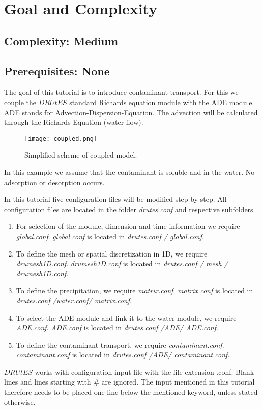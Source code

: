 \documentclass[
10pt, %
a4paper, %
oneside, %
headinclude,footinclude, %
BCOR5mm, %
]{scrartcl}
\begin{document}
\section{Goal and Complexity}
\subsection*{Complexity: Medium}

\subsection*{Prerequisites: None}

The goal of this tutorial is to introduce contaminant transport. For this we couple the $DRUtES$ standard Richards equation module with the ADE module. ADE stands for Advection-Dispersion-Equation. The advection will be calculated through the Richards-Equation (water flow).

\begin{figure}[!h]
\centering
\texttt{[image: coupled.png]}
\caption{Simplified scheme of coupled model.}
\end{figure}

In this example we assume that the contaminant is soluble and in the water. No adsorption or desorption occurs. 

In this tutorial five configuration files will be modified step by step. All configuration files are located in the folder \emph{drutes.conf} and respective subfolders. \begin{enumerate}
\item For selection of the module, dimension and time information we require \emph{global.conf}.  \emph{global.conf} is located in \emph{drutes.conf / global.conf}. 
\item To define the mesh or spatial discretization in 1D,  we require \emph{drumesh1D.conf}. \emph{drumesh1D.conf} is located in \emph{drutes.conf / mesh / drumesh1D.conf}. 
\item To define the precipitation, we require \emph{matrix.conf}. \emph{matrix.conf} is located in \emph{drutes.conf /water.conf/ matrix.conf}. 
\item To select the ADE module and link it to the water module, we require \emph{ADE.conf}. \emph{ADE.conf} is located in \emph{drutes.conf /ADE/ ADE.conf}. 
\item To define the contaminant transport, we require \emph{contaminant.conf}. \emph{contaminant.conf} is located in \emph{drutes.conf /ADE/ contaminant.conf}. 
\end{enumerate}
$DRUtES$ works with configuration input file with the file extension .conf. Blank lines and lines starting with \# are ignored. The input mentioned in this tutorial therefore needs to be placed one line below the mentioned keyword, unless stated otherwise. 
\end{document}
